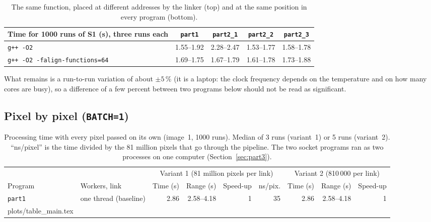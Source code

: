 \documentclass[11pt,a4paper]{article}
\makeatletter
\newcommand{\rows}[1]{\@@input plots/#1.tex }
\makeatother
\begin{document}
\begin{table}[H]
\centering\small
\begin{tabular}{@{}lcccc@{}}
\toprule
Time for 1000 runs of S1 (s), three runs each & \texttt{part1} & \texttt{part2\_1} & \texttt{part2\_2} & \texttt{part2\_3} \\
\midrule
\texttt{g++ -O2}                         & 1.55--1.92 & 2.28--2.47 & 1.53--1.77 & 1.58--1.78 \\
\texttt{g++ -O2 -falign-functions=64}    & 1.69--1.75 & 1.67--1.79 & 1.61--1.78 & 1.73--1.88 \\
\bottomrule
\end{tabular}
\caption{The same function, placed at different addresses by the linker (top) and at the same
position in every program (bottom).}
\label{tab:align}
\end{table}

\noindent What remains is a run-to-run variation of about $\pm5\,\%$ (it is a laptop: the clock
frequency depends on the temperature and on how many cores are busy), so a difference of a few
percent between two programs below should not be read as significant.

\subsection{Pixel by pixel (\texttt{BATCH=1})}

\begin{table}[H]
\centering\small
\setlength{\tabcolsep}{2.6pt}
\begin{tabular}{@{}ll rrrr rrr@{}}
\toprule
& & \multicolumn{4}{c}{Variant 1 (81 million pixels per link)} & \multicolumn{3}{c}{Variant 2 (810\,000 per link)} \\
\cmidrule(lr){3-6}\cmidrule(l){7-9}
Program & Workers, link & Time (s) & Range (s) & Speed-up & ns/pix. & Time (s) & Range (s) & Speed-up \\
\midrule
\texttt{part1} & one thread (baseline) & 2.86 & 2.58--4.18 & 1 & 35 & 2.86 & 2.58--4.18 & 1 \\
\midrule
\rows{table_main}
\bottomrule
\end{tabular}
\caption{Processing time with every pixel passed on its own (image~1, 1000 runs). Median of 3 runs
(variant~1) or 5 runs (variant~2). ``ns/pixel'' is the time divided by the 81 million pixels that
go through the pipeline. The two socket programs ran as two processes on one computer (Section~\ref{sec:part3}).}
\label{tab:main}
\end{table}
\end{document}
